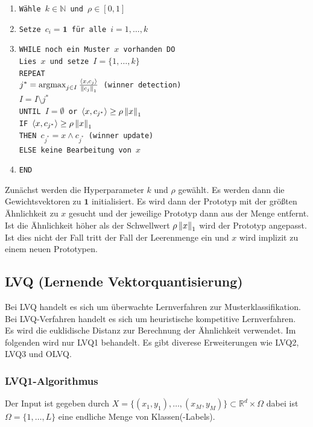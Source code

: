 \begin{enumerate}
    \item \texttt{Wähle $k\in\mathbb{N}$ und $\rho\in[0,1]$}
    \item \texttt{Setze $c_i=\textbf{1}$ für alle $i=1,\dots,k$}
    \item \texttt{WHILE noch ein Muster $x$ vorhanden DO\\
        Lies $x$ und setze $I=\{1,\dots,k\}$\\
        REPEAT\\
        $j^* = \operatorname{argmax}_{j\in I}\frac{\langle x,c_j\rangle}{\left\lVert c_j\right\rVert_1}$ (winner detection)\\
        $I = I \setminus {j^*}$\\
        UNTIL $I=\emptyset$ or $\langle x, c_{j^*} \rangle \geq \rho \left\lVert x\right\rVert_1$\\
        IF $\langle x, c_{j^*} \rangle \geq \rho \left\lVert x\right\rVert_1$\\
        THEN $c_{j^*} = x\wedge c_{j^*}$ (winner update)\\
        ELSE keine Bearbeitung von $x$
        }
    \item \texttt{END}
\end{enumerate}
Zunächst werden die Hyperparameter $k$ und $\rho$ gewählt. Es werden dann die Gewichtsvektoren zu $\textbf{1}$ initialisiert. Es wird dann der Prototyp mit der größten Ähnlichkeit zu $x$ gesucht und der jeweilige Prototyp dann aus der Menge entfernt. Ist die Ähnlichkeit höher als der Schwellwert $\rho \left\lVert x\right\rVert_1$ wird der Prototyp angepasst. Ist dies nicht der Fall tritt der Fall der Leerenmenge ein und $x$ wird implizit zu einem neuen Prototypen.

\subsection{LVQ (Lernende Vektorquantisierung)}
Bei LVQ handelt es sich um überwachte Lernverfahren zur Musterklassifikation. Bei LVQ-Verfahren handelt es sich um heuristische kompetitive Lernverfahren.\\
Es wird die euklidische Distanz zur Berechnung der Ähnlichkeit verwendet. Im folgenden wird nur LVQ1 behandelt. Es gibt diverese Erweiterungen wie LVQ2, LVQ3 und OLVQ.

\subsubsection{LVQ1-Algorithmus}
Der Input ist gegeben durch $X = \{(x_1,y_1),\dots,(x_M,y_M)\}\subset\mathbb{R}^d\times\Omega$ dabei ist $\Omega=\{1,\dots,L\}$ eine endliche Menge von Klassen(-Labels).

